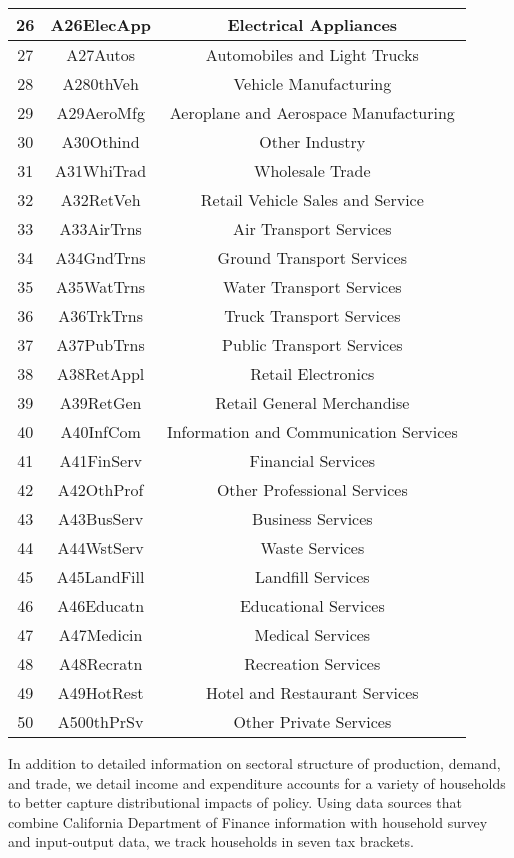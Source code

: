 \documentclass[12pt]{article}
\begin{document}
\begin{center}
\begin{footnotesize}
\begin{tabular}{|c|c|c|}
\hline 26 & A26ElecApp & Electrical Appliances \\
\hline 27 & A27Autos & Automobiles and Light Trucks \\
\hline 28 & A280thVeh & Vehicle Manufacturing \\
\hline 29 & A29AeroMfg & Aeroplane and Aerospace Manufacturing \\
\hline 30 & A30Othind & Other Industry \\
\hline 31 & A31WhiTrad & Wholesale Trade \\
\hline 32 & A32RetVeh & Retail Vehicle Sales and Service \\
\hline 33 & A33AirTrns & Air Transport Services \\
\hline 34 & A34GndTrns & Ground Transport Services \\
\hline 35 & A35WatTrns & Water Transport Services \\
\hline 36 & A36TrkTrns & Truck Transport Services \\
\hline 37 & A37PubTrns & Public Transport Services \\
\hline 38 & A38RetAppl & Retail Electronics \\
\hline 39 & A39RetGen & Retail General Merchandise \\
\hline 40 & A40InfCom & Information and Communication Services \\
\hline 41 & A41FinServ & Financial Services \\
\hline 42 & A42OthProf & Other Professional Services \\
\hline 43 & A43BusServ & Business Services \\
\hline 44 & A44WstServ & Waste Services \\
\hline 45 & A45LandFill & Landfill Services \\
\hline 46 & A46Educatn & Educational Services \\
\hline 47 & A47Medicin & Medical Services \\
\hline 48 & A48Recratn & Recreation Services \\
\hline 49 & A49HotRest & Hotel and Restaurant Services \\
\hline 50 & A500thPrSv & Other Private Services \\
\hline
\end{tabular}
\end{footnotesize}
\end{center}

\newpage

In addition to detailed information on sectoral structure of production, demand, and trade, we detail income and expenditure accounts for a variety of households to better capture distributional impacts of policy. Using data sources that combine California Department of Finance information with household survey and input-output data, we track households in seven tax brackets.
\end{document}
